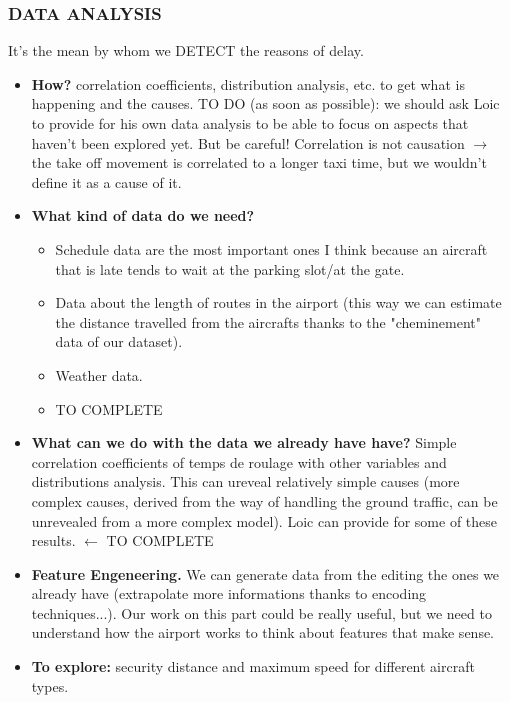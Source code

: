 \documentclass{article}
\begin{document}
\subsubsection*{DATA ANALYSIS }
It's the mean by whom we DETECT the reasons of delay.
\begin{itemize}
\item \textbf{How?} correlation coefficients, distribution analysis, etc. to get what is happening and the causes. TO DO (as soon as possible): we should ask Loic to provide for his own data analysis to be able to focus on aspects that haven't been explored yet. 
But be careful! Correlation is not causation $\rightarrow$ the take off movement is correlated to a longer taxi time, but we wouldn't define it as a cause of it.

\item \textbf{ What kind of data do we need? }
\begin{itemize}
\item Schedule data are the most important ones I think because an aircraft that is late tends to wait at the parking slot/at the gate.

\item Data about the length of routes in the airport (this way we can estimate the distance travelled from the aircrafts thanks to the "cheminement" data of our dataset). 
	
\item Weather data.

\item TO COMPLETE
\end{itemize}
	

\item \textbf{What can we do with the data we already have have?}
	Simple correlation coefficients of temps de roulage with other variables and distributions analysis. This can ureveal relatively simple causes (more complex causes, derived from the way of handling the ground traffic, can be unrevealed from a more complex model). Loic can provide for some of these results. $\leftarrow$ TO COMPLETE

\item \textbf{Feature Engeneering.} We can generate data from the editing the ones we already have (extrapolate more informations thanks to encoding techniques...). Our work on this part could be really useful, but we need to understand how the airport works to think about features that make sense.
	
\item \textbf{To explore:} security distance and maximum speed for different aircraft types.


\end{itemize}
\end{document}
